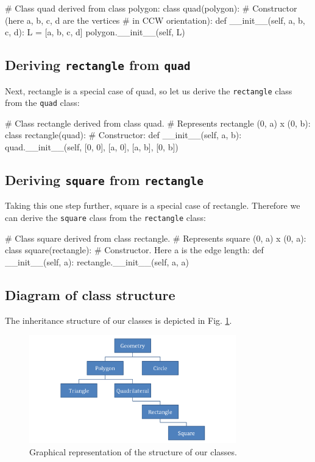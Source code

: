 \begin{bluecode}
# Class quad derived from class polygon:
class quad(polygon):
    # Constructor (here a, b, c, d are the vertices
    # in CCW orientation):
    def __init__(self, a, b, c, d):
        L = [a, b, c, d]
        polygon.__init__(self, L)
\end{bluecode}

\subsection{Deriving {\tt rectangle} from {\tt quad}}

Next, rectangle is a special case of quad, so let us derive the 
{\tt rectangle} class from the {\tt quad} class:

\begin{bluecode}
# Class rectangle derived from class quad.
# Represents rectangle (0, a) x (0, b):
class rectangle(quad):
    # Constructor:
    def __init__(self, a, b):
        quad.__init__(self, [0, 0], [a, 0], [a, b], [0, b])
\end{bluecode}

\subsection{Deriving {\tt square} from {\tt rectangle}}

Taking this one step further, square is a special case of rectangle. Therefore 
we can derive the {\tt square} class from the {\tt rectangle} class:

\begin{bluecode}
# Class square derived from class rectangle.
# Represents square (0, a) x (0, a):
class square(rectangle):
    # Constructor. Here a is the edge length:
    def __init__(self, a):
        rectangle.__init__(self, a, a)
\end{bluecode}

\subsection{Diagram of class structure}

The inheritance structure of our classes is depicted in Fig. \ref{fig:classes}.

\begin{figure}[!ht]
\begin{center}
\includegraphics[width=0.8\textwidth]{imgp/classes.png}
\end{center}
\vspace{-2mm}
\caption{Graphical representation of the structure of our classes.}
\label{fig:classes}
\end{figure}

